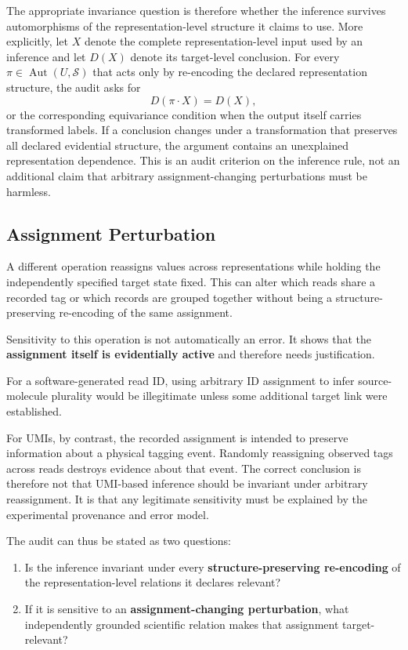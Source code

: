 \documentclass[12pt]{article}
\begin{document}
The appropriate invariance question is therefore whether the inference survives automorphisms of the representation-level structure it claims to use. More explicitly, let \(X\) denote the complete representation-level input used by an inference and let \(D(X)\) denote its target-level conclusion. For every \(\pi\in\operatorname{Aut}(U,\mathcal S)\) that acts only by re-encoding the declared representation structure, the audit asks for
\[
D(\pi\cdot X)=D(X),
\]
or the corresponding equivariance condition when the output itself carries transformed labels. If a conclusion changes under a transformation that preserves all declared evidential structure, the argument contains an unexplained representation dependence. This is an audit criterion on the inference rule, not an additional claim that arbitrary assignment-changing perturbations must be harmless.

\subsection{Assignment Perturbation}

A different operation reassigns values across representations while holding the independently specified target state fixed. This can alter which reads share a recorded tag or which records are grouped together without being a structure-preserving re-encoding of the same assignment.

Sensitivity to this operation is not automatically an error. It shows that the \textbf{assignment itself is evidentially active} and therefore needs justification.

For a software-generated read ID, using arbitrary ID assignment to infer source-molecule plurality would be illegitimate unless some additional target link were established.

For UMIs, by contrast, the recorded assignment is intended to preserve information about a physical tagging event. Randomly reassigning observed tags across reads destroys evidence about that event. The correct conclusion is therefore not that UMI-based inference should be invariant under arbitrary reassignment. It is that any legitimate sensitivity must be explained by the experimental provenance and error model.

The audit can thus be stated as two questions:

\begin{enumerate}[leftmargin=*]
\item Is the inference invariant under every \textbf{structure-preserving re-encoding} of the representation-level relations it declares relevant?
\item If it is sensitive to an \textbf{assignment-changing perturbation}, what independently grounded scientific relation makes that assignment target-relevant?
\end{enumerate}
\end{document}
